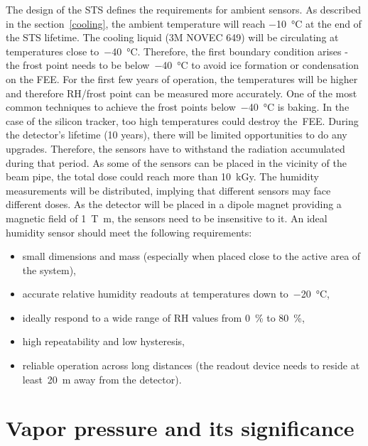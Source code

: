 The design of the \gls{STS} \cite{Heuser:54798} defines the requirements for ambient sensors. As described in the section~\ref{cooling}, the ambient temperature will reach \SI{-10}{\celsius} at the end of the \gls{STS} lifetime. The cooling liquid (3M NOVEC 649) will be circulating at temperatures close to~\SI{-40}{\celsius}. Therefore, the first boundary condition arises - the frost point needs to be below~\SI{-40}{\celsius} to avoid ice formation or condensation on the \gls{FEE}. For the first few years of operation, the temperatures will be higher and therefore RH/frost point can be measured more accurately. One of the most common techniques to achieve the frost points below~\SI{-40}{\celsius} is baking. In the case of the silicon tracker, too high temperatures could destroy the~\gls{FEE}. 
During the detector's lifetime (10 years), there will be limited opportunities to do any upgrades. Therefore, the sensors have to withstand the radiation accumulated during that period. As some of the sensors can be placed in the vicinity of the beam pipe, the total dose could reach more than 10~kGy. The humidity measurements will be distributed, implying that different sensors may face different doses. As the detector will be placed in a dipole magnet providing a magnetic field of \SI{1}{\tesla\metre}, the sensors need to be insensitive to it. An ideal humidity sensor should meet the following requirements:
\begin{itemize}
    \item small dimensions and mass (especially when placed close to the active area of the system),
    \item accurate relative humidity readouts at temperatures down to~\SI{-20}{\celsius}, 
    \item ideally respond to a wide range of \gls{RH} values from 0~\% to 80~\%,
    \item high repeatability and low hysteresis,
    \item reliable operation across long distances (the readout device needs to reside at least~\SI{20}{\metre} away from the detector).
\end{itemize}

\section{Vapor pressure and its significance}

